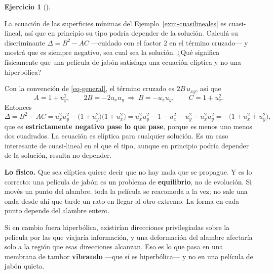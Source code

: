 \documentclass[
  spanish,
  a4paper,
]{scrbook}
\theoremstyle{definition}
\theoremstyle{plain}
\theoremstyle{definition}
\theoremstyle{plain}
\theoremstyle{definition}
\newtheorem{exercise}{Ejercicio}[chapter]
\theoremstyle{remark}
\begin{document}
\begin{exercise}[]\protect\hypertarget{exr-superficie-minima}{}\label{exr-superficie-minima}

La ecuación de las superficies mínimas del
Ejemplo~\ref{exm-cuasilineales} es cuasi-lineal, así que en principio su
tipo podría depender de la solución. Calculá su discriminante
\(\Delta = B^2 - AC\) ---cuidado con el factor \(2\) en el término
cruzado--- y mostrá que es siempre negativo, sea cual sea la solución.
¿Qué significa físicamente que una película de jabón satisfaga una
ecuación elíptica y no una hiperbólica?

\end{exercise}

\begin{tcolorbox}[enhanced jigsaw, arc=.35mm, bottomrule=.15mm, bottomtitle=1mm, breakable, colback=white, colbacktitle=quarto-callout-tip-color!10!white, colframe=quarto-callout-tip-color-frame, coltitle=black, left=2mm, leftrule=.75mm, opacityback=0, opacitybacktitle=0.6, rightrule=.15mm, title=\textcolor{quarto-callout-tip-color}{\faLightbulb}\hspace{0.5em}{Solución}, titlerule=0mm, toprule=.15mm, toptitle=1mm]

Con la convención de \ref{eq-general}, el término cruzado es
\(2B\,u_{xy}\), así que
\[A = 1+u_y^2, \qquad 2B = -2u_xu_y \ \Rightarrow\ B = -u_xu_y, \qquad C = 1+u_x^2 .\]
Entonces \[
\Delta = B^2 - AC = u_x^2u_y^2 - \big(1+u_y^2\big)\big(1+u_x^2\big)
= u_x^2u_y^2 - 1 - u_x^2 - u_y^2 - u_x^2u_y^2 = -\big(1 + u_x^2 + u_y^2\big),
\] que es \textbf{estrictamente negativo pase lo que pase}, porque es
menos uno menos dos cuadrados. La ecuación es elíptica para cualquier
solución. Es un caso interesante de cuasi-lineal en el que el tipo,
aunque en principio podría depender de la solución, resulta no depender.

\textbf{Lo físico.} Que sea elíptica quiere decir que no hay nada que se
propague. Y es lo correcto: una película de jabón es un problema de
\textbf{equilibrio}, no de evolución. Si movés un punto del alambre,
toda la película se reacomoda a la vez; no sale una onda desde ahí que
tarde un rato en llegar al otro extremo. La forma en cada punto depende
del alambre entero.

Si en cambio fuera hiperbólica, existirían direcciones privilegiadas
sobre la película por las que viajaría información, y una deformación
del alambre afectaría solo a la región que esas direcciones alcanzan.
Eso es lo que pasa en una membrana de tambor \textbf{vibrando} ---que sí
es hiperbólica--- y no en una película de jabón quieta.

\end{tcolorbox}
\end{document}
